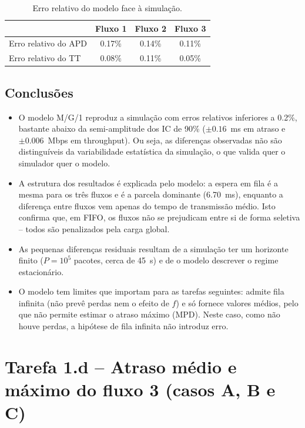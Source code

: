 \documentclass[11pt,a4paper]{article}
\begin{document}
\begin{table}[htbp]
    \centering
    \caption{Erro relativo do modelo face à simulação.}
    \label{tab:1c-err}
    \begin{tabular}{lccc}
        \toprule
        & Fluxo 1 & Fluxo 2 & Fluxo 3 \\
        \midrule
        Erro relativo do APD & 0.17\% & 0.14\% & 0.11\% \\
        Erro relativo do TT  & 0.08\% & 0.11\% & 0.05\% \\
        \bottomrule
    \end{tabular}
\end{table}

\subsection*{Conclusões}

\begin{itemize}
    \item O modelo M/G/1 reproduz a simulação com erros relativos inferiores a
    0.2\%, bastante abaixo da semi-amplitude dos IC de 90\% ($\pm0.16$~ms em
    atraso e $\pm0.006$~Mbps em throughput). Ou seja, as diferenças observadas não
    são distinguíveis da variabilidade estatística da simulação, o que valida
    quer o simulador quer o modelo.
    \item A estrutura dos resultados é explicada pelo modelo: a espera em fila
    é a mesma para os três fluxos e é a parcela dominante (6.70~ms), enquanto a
    diferença entre fluxos vem apenas do tempo de transmissão médio. Isto
    confirma que, em FIFO, os fluxos não se prejudicam entre si de forma
    seletiva -- todos são penalizados pela carga global.
    \item As pequenas diferenças residuais resultam de a simulação ter um
    horizonte finito ($P=10^5$ pacotes, cerca de 45~s) e de o modelo descrever
    o regime estacionário.
    \item O modelo tem limites que importam para as tarefas seguintes: admite
    fila infinita (não prevê perdas nem o efeito de $f$) e só fornece valores
    médios, pelo que não permite estimar o atraso máximo (MPD). Neste caso,
    como não houve perdas, a hipótese de fila infinita não introduz erro.
\end{itemize}

\newpage

\section{Tarefa 1.d -- Atraso médio e máximo do fluxo 3 (casos A, B e C)}
\end{document}
